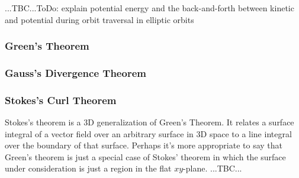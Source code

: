 ...TBC...ToDo: explain potential energy and the back-and-forth between kinetic and potential during orbit traversal in elliptic orbits




\subsubsection{Green's Theorem}

% 

\subsubsection{Gauss's Divergence Theorem}

\subsubsection{Stokes's Curl Theorem}
Stokes's theorem is a 3D generalization of Green's Theorem. It relates a surface integral of a vector field over an arbitrary surface in 3D space to a line integral over the boundary of that surface. Perhaps it's more appropriate to say that Green's theorem is just a special case of Stokes' theorem in which the surface under consideration is just a region in the flat $xy$-plane. ...TBC...







